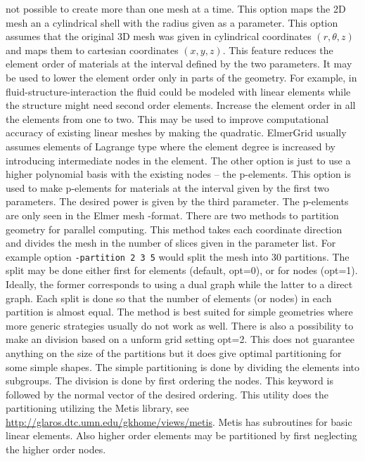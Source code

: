 not possible to create more than one mesh at a time.
%
This option maps the 2D mesh an a cylindrical shell with the radius
given as a parameter.
%
This option assumes that the original 3D mesh was given in 
cylindrical coordinates $(r,\theta,z)$ and maps them to cartesian 
coordinates $(x,y,z)$.
%
This feature reduces the element order of materials at the interval
defined by the two parameters. It may be used to lower the element order 
only in parts of the geometry. For example, in fluid-structure-interaction the 
fluid could be modeled with linear elements while the 
structure might need second order elements.
%
Increase the element order in all the elements from one to two.
This may be used to improve computational accuracy of existing 
linear meshes by making the quadratic.
%
ElmerGrid usually assumes elements of Lagrange type where 
the element degree is increased by introducing intermediate nodes
in the element. The other option is just to use a higher polynomial basis
with the existing nodes -- the p-elements. 
This option is used to make p-elements for materials at the interval given by
the first two parameters. The desired power is given by the third parameter.
The p-elements are only seen in the Elmer mesh -format.
%
There are two methods to partition geometry for parallel computing. This
method takes each coordinate direction and divides the mesh in the number
of slices given in the parameter list. For example option
\texttt{-partition 2 3 5} would split the mesh into 30 partitions. 
The split may be done either first for elements (default, opt=0), or 
for nodes (opt=1). Ideally, the former corresponds to using a dual graph while 
the latter to a direct graph. 
Each split is done so that the number of elements (or nodes) in each partition
is almost equal. The method is best suited for simple geometries 
where more generic strategies usually do not work as well.
There is also a possibility to make an division based on a unform
grid setting opt=2. This does not guarantee anything on the size of 
the partitions but it does give optimal partitioning for some simple 
shapes.
%
The simple partitioning is done by dividing the elements
into subgroups. The division is done by first ordering the nodes. This
keyword is followed by the normal vector of the desired ordering.
%
This utility does the partitioning utilizing the Metis library, see
\url{http://glaros.dtc.umn.edu/gkhome/views/metis}. Metis has subroutines
for basic linear elements. Also higher order elements may be partitioned
by first neglecting the higher order nodes.

